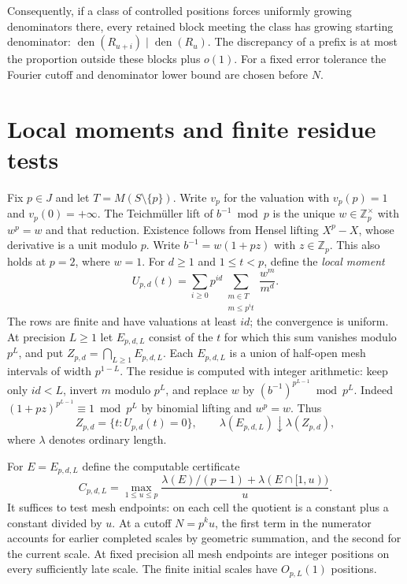 \documentclass[11pt]{article}
\newcommand{\Z}{\mathbb Z}
\newcommand{\vol}{\lambda}
\newcommand{\den}{\operatorname{den}}
\begin{document}
Consequently, if a class of controlled positions forces uniformly growing denominators there, every retained block meeting the class has growing starting denominator: \(\den(R_{u+i})\mid\den(R_u)\). The discrepancy of a prefix is at most the proportion outside these blocks plus \(o(1)\). For a fixed error tolerance the Fourier cutoff and denominator lower bound are chosen before \(N\).

\section{Local moments and finite residue tests}
Fix \(p\in J\) and let \(T=M(S\setminus\{p\})\). Write \(v_p\) for the valuation with \(v_p(p)=1\) and \(v_p(0)=+\infty\). The Teichm\"uller lift of \(b^{-1}\bmod p\) is the unique \(w\in\Z_p^\times\) with \(w^p=w\) and that reduction. Existence follows from Hensel lifting \(X^p-X\), whose derivative is a unit modulo \(p\). Write \(b^{-1}=w(1+pz)\) with \(z\in\Z_p\). This also holds at \(p=2\), where \(w=1\). For \(d\ge1\) and \(1\le t<p\), define the \emph{local moment}
\begin{equation}\label{eq:moment}
 U_{p,d}(t)=\sum_{i\ge0}p^{id}
       \sum_{\substack{m\in T\\m\le p^it}}\frac{w^m}{m^d}.
\end{equation}
The rows are finite and have valuations at least \(id\); the convergence is uniform. At precision \(L\ge1\) let \(E_{p,d,L}\) consist of the \(t\) for which this sum vanishes modulo \(p^L\), and put \(Z_{p,d}=\bigcap_{L\ge1}E_{p,d,L}\). Each \(E_{p,d,L}\) is a union of half-open mesh intervals of width \(p^{1-L}\). The residue is computed with integer arithmetic: keep only \(id<L\), invert \(m\) modulo \(p^L\), and replace \(w\) by \((b^{-1})^{p^{L-1}}\bmod p^L\). Indeed \((1+pz)^{p^{L-1}}\equiv1\bmod p^L\) by binomial lifting and \(w^p=w\). Thus
\begin{equation}\label{eq:persistent}
 Z_{p,d}=\{t:U_{p,d}(t)=0\},\qquad
 \vol(E_{p,d,L})\downarrow\vol(Z_{p,d}),
\end{equation}
where \(\vol\) denotes ordinary length.

For \(E=E_{p,d,L}\) define the computable certificate
\begin{equation}\label{eq:price}
 C_{p,d,L}=\max_{1\le u\le p}
 \frac{\vol(E)/(p-1)+\vol(E\cap[1,u))}{u}.
\end{equation}
It suffices to test mesh endpoints: on each cell the quotient is a constant plus a constant divided by \(u\). At a cutoff \(N=p^k u\), the first term in the numerator accounts for earlier completed scales by geometric summation, and the second for the current scale. At fixed precision all mesh endpoints are integer positions on every sufficiently late scale. The finite initial scales have \(O_{p,L}(1)\) positions.
\end{document}
